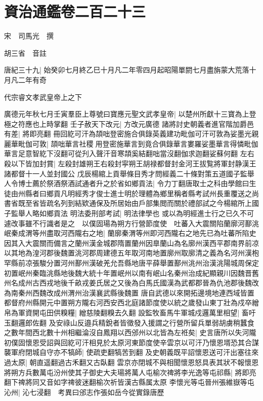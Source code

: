 \section{資治通鑑卷二百二十三}
宋　司馬光　撰

胡三省　音註

唐紀三十九|{
	始癸卯七月終乙巳十月凡二年零四月起昭陽單閼七月盡旃蒙大荒落十月凡二年有奇}


代宗睿文孝武皇帝上之下

廣德元年秋七月壬寅羣臣上尊號曰寶應元聖文武孝皇帝|{
	以楚州所獻十三寶為上登極之符應也上時掌翻}
壬子赦天下改元|{
	方改元廣德}
諸將討史朝義者進官階加爵邑有差|{
	將即亮翻}
冊回紇可汗為頡咄登密施合俱錄英義建功毗伽可汗可敦為娑墨光親麗華毗伽可敦|{
	頡咄華言社稷用登密施華言到竟合俱錄華言婁羅娑墨華言得憐毗伽華言足意智紇下沒翻可從刋入聲汗音寒頡奚結翻咄當沒翻伽求迦翻娑蘇何翻}
左右殺以下皆加封賞|{
	左殺封雄朔王右殺封寜朔王胡禄都督封金河王拔覧將軍封静漢王諸都督十一人並封國公}
戊辰楊綰上貢舉條目秀才問經義二十條對策五道國子監舉人令博士薦於祭酒祭酒試通者升之於省如鄉貢法|{
	令力丁翻唐取士之科由學館曰生徒由州縣者曰鄉貢凡明經秀才俊士進士明於理體為鄉里稱者縣考試州長重覆送之尚書省既至省皆疏名列到結欵通保及所居始由戶部集閲而關於禮部試之今楊綰所上國子監舉人略如鄉貢法}
明法委刑部考試|{
	明法律學也}
或以為明經進士行之已久不可遽改事雖不行識者是之　以僕固瑒為朔方行營節度使　吐蕃入大震關陷蘭廓河鄯洮岷秦成渭等州盡取河西隴右之地|{
	蘭廓秦渭等州即河西隴右之地先已為吐蕃所陷史因其入大震關而備言之蘭州漢金城郡隋置蘭州因臯蘭山為名廓州漢西平郡南界前凉以其地為湟河郡後魏置洮河郡周建德五年取河南地置廓州取廓清之義為名河州漢枹罕縣前凉張駿分置河州鄯州漢破羌允吾縣地唐平薛舉置鄯州洮州治漢洮陽城周保定初置岷州秦臨洮縣地後魏大統十年置岷州以南有岷山名秦州治成紀顯親川因魏晋舊州名成州古西戎地後千畝戎姜氏居之又後為白馬氏國漢為武都郡晉為仇池郡後魏改為南秦州西魏改成州渭州治漢襄武縣後魏置}
唐自武德以來開拓邊境地連西域皆置都督府州縣開元中置朔方隴右河西安西北庭諸節度使以統之歲發山東丁壯為戍卒繒帛為軍資開屯田供糗糧|{
	繒慈陵翻糗去久翻}
設監牧畜馬牛軍城戍邏萬里相望|{
	畜吁玉翻邏郎佐翻}
及安祿山反邉兵精銳者皆徵發入援謂之行營所留兵單弱胡虜稍蠶食之數年間西北數十州相繼淪沒自鳳翔以西邠州以北皆為左袵矣|{
	史言唐所以失河隴}
初僕固懷恩受詔與回紇可汗相見於太原河東節度使辛雲京以可汗乃懷恩壻恐其合謀襲軍府閉城自守亦不犒師|{
	使疏吏翻犒苦到翻}
及史朝義既平詔懷恩送可汗出塞往來過太原|{
	朝直遥翻過古禾翻又古臥翻}
雲京亦閉城不與相聞懷恩怒具表其狀不報懷恩將朔方兵數萬屯汾州使其子御史大夫瑒將萬人屯榆次禆將李光逸等屯祁縣|{
	將即亮翻下禆將同又音如字禆彼迷翻榆次祈皆漢古縣属太原}
李懷光等屯晉州張維嶽等屯沁州|{
	沁七浸翻　考異曰邠志作張如岳今從實錄唐歷}
